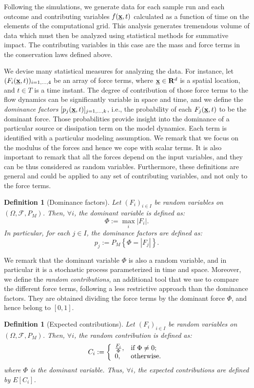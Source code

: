 \documentclass{article}
\newtheorem{definition}[theorem]{Definition}
\begin{document}
Following the simulations, we generate data for each sample run and each outcome and contributing variables $f(\underline{\textbf x},t)$ calculated as a function of time on the elements of the computational grid. This analysis generates tremendous volume of data which must then be analyzed using statistical methods for summative impact. The contributing variables in this case are the mass and force terms in the conservation laws defined above.

We devise many statistical measures for analyzing the data. For instance, let $(F_i(\underline{\textbf x},t))_{i=1,\dots, 4}$ be an array of force terms, where $\underline{\textbf x}\in \mathbf R^d$ is a spatial location, and $t\in T$ is a time instant. The degree of contribution of those force terms to the flow dynamics can be significantly variable in space and time, and we define the \emph{dominance factors} $[p_j(\underline{\textbf x},t)]_{j=1,\dots, k}$, i.e., the probability of each $F_j(\underline{\textbf x},t)$ to be the dominant force. Those probabilities provide insight into the dominance of a particular source or dissipation term on the model dynamics. Each term is identified with a particular modeling assumption. We remark that we focus on the modulus of the forces and hence we cope with scalar terms. It is also important to remark that all the forces depend on the input variables, and they can be thus considered as random variables. Furthermore, these definitions are general and could be applied to any set of contributing variables, and not only to the force terms.

\begin{definition}[Dominance factors]
Let $(F_i)_{i\in I}$ be random variables on $(\Omega, \mathcal F, P_M)$. Then, $\forall i$, the dominant variable is defined as:
$$\Phi:=\max_i |F_i|.$$
In particular, for each $j \in I$, the dominance factors are defined as:
$$p_j:=P_M\left\{\Phi=|F_j|\right\}.$$
\end{definition}

We remark that the dominant variable $\Phi$ is also a random variable, and in particular it is a stochastic process parameterized in time and space. Moreover, we define the \emph{random contributions}, an additional tool that we use to compare the different force terms, following a less restrictive approach than the dominance factors. They are obtained dividing the force terms by the dominant force $\Phi$, and hence belong to $[0,1]$.

\begin{definition}[Expected contributions]
Let $(F_i)_{i\in I}$ be random variables on $(\Omega, \mathcal F, P_M)$. Then, $\forall i$, the random contribution is defined as:
$$C_i:=\left\{
\begin{array}{ll}
      \frac{F_i}{\Phi}, & \textrm{if }\Phi\neq 0; \\
      0, & \hbox{otherwise.}
    \end{array}
  \right.$$
where $\Phi$ is the dominant variable. Thus, $\forall i$, the expected contributions are defined by $E\left[C_i\right]$.
\end{definition}
\end{document}
